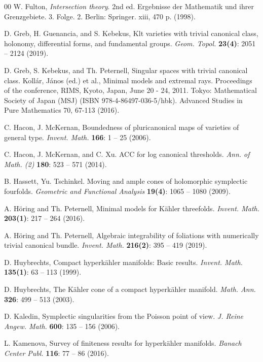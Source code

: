\documentclass[12pt,reqno]{amsart}
\theoremstyle{plain}
\theoremstyle{definition}
\begin{document}
\begin{thebibliography}{00}
W. Fulton, \textit{Intersection theory}. 2nd ed. Ergebnisse der Mathematik und ihrer Grenzgebiete. 3. Folge. 2. Berlin: Springer. xiii, 470 p. (1998).

D. Greb, H. Guenancia, and S. Kebekus, Klt varieties with trivial canonical
class, holonomy, differential forms, and fundamental groups.  \textit{Geom. Topol.} \textbf{23(4)}: 2051 -- 2124 (2019).


D. Greb, S. Kebekus, and Th. Peternell, Singular spaces with trivial
canonical class. Koll\'ar, J\'anos (ed.) et al., Minimal models and extremal rays. Proceedings of the conference, RIMS, Kyoto, Japan, June 20 - 24, 2011. Tokyo: Mathematical Society of Japan (MSJ) (ISBN 978-4-86497-036-5/hbk). Advanced Studies in Pure Mathematics 70, 67-113 (2016).

C. Hacon, J. McKernan, Boundedness of pluricanonical maps of varieties of
general type. \textit{Invent. Math.} \textbf{166}: 1 -- 25 (2006).

C. Hacon, J. McKernan, and C. Xu. ACC for log canonical thresholds. \textit{Ann. of Math. (2)} \textbf{180}: 523 -- 571 (2014).

B. Hassett, Yu. Tschinkel. Moving and ample cones of holomorphic symplectic fourfolds. \textit{Geometric and Functional Analysis} \textbf{19(4)}: 1065 -- 1080 (2009).

A. H\"oring and Th. Peternell, Minimal models for K\"ahler threefolds.
\textit{Invent. Math.} \textbf{203(1)}: 217 -- 264 (2016).

A. H\"oring and Th. Peternell,
Algebraic integrability of foliations with numerically trivial canonical bundle. 
\textit{Invent. Math.} \textbf{216(2)}: 395 -- 419 (2019).

D. Huybrechts, Compact hyperk\"ahler manifolds: Basic results. \textit{Invent. Math.} \textbf{135(1)}: 63 -- 113 (1999).  

D. Huybrechts, The K\"ahler cone of a compact hyperk\"ahler manifold. \textit{Math. Ann.} \textbf{326}: 499 -- 513 (2003).

D. Kaledin, Symplectic singularities from the Poisson point of view. 
\textit{J. Reine Angew. Math.} \textbf{600}: 135 -- 156 (2006).

L. Kamenova, Survey of finiteness results for hyperk\"ahler manifolds. \textit{Banach Center Publ.} \textbf{116}: 77 -- 86 (2016).



\end{thebibliography}
\end{document}

